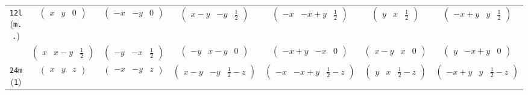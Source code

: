 \documentclass[fleqn,9pt,landscape]{jsarticle}
\begin{document}
\begin{center}
\begin{longtable}{ccccccc}
{\tt 12l} ({\tt m..}) & $ \begin{pmatrix} x & y & 0 \end{pmatrix} $ & $ \begin{pmatrix} - x & - y & 0 \end{pmatrix} $ & $ \begin{pmatrix} x - y & - y & \frac{1}{2} \end{pmatrix} $ & $ \begin{pmatrix} - x & - x + y & \frac{1}{2} \end{pmatrix} $ & $ \begin{pmatrix} y & x & \frac{1}{2} \end{pmatrix} $ & $ \begin{pmatrix} - x + y & y & \frac{1}{2} \end{pmatrix} $ \\
& $ \begin{pmatrix} x & x - y & \frac{1}{2} \end{pmatrix} $ & $ \begin{pmatrix} - y & - x & \frac{1}{2} \end{pmatrix} $ & $ \begin{pmatrix} - y & x - y & 0 \end{pmatrix} $ & $ \begin{pmatrix} - x + y & - x & 0 \end{pmatrix} $ & $ \begin{pmatrix} x - y & x & 0 \end{pmatrix} $ & $ \begin{pmatrix} y & - x + y & 0 \end{pmatrix} $ \\ \hline
{\tt 24m} ({\tt 1}) & $ \begin{pmatrix} x & y & z \end{pmatrix} $ & $ \begin{pmatrix} - x & - y & z \end{pmatrix} $ & $ \begin{pmatrix} x - y & - y & \frac{1}{2} - z \end{pmatrix} $ & $ \begin{pmatrix} - x & - x + y & \frac{1}{2} - z \end{pmatrix} $ & $ \begin{pmatrix} y & x & \frac{1}{2} - z \end{pmatrix} $ & $ \begin{pmatrix} - x + y & y & \frac{1}{2} - z \end{pmatrix} $ \\

\end{longtable}
\end{center}
\end{document}
